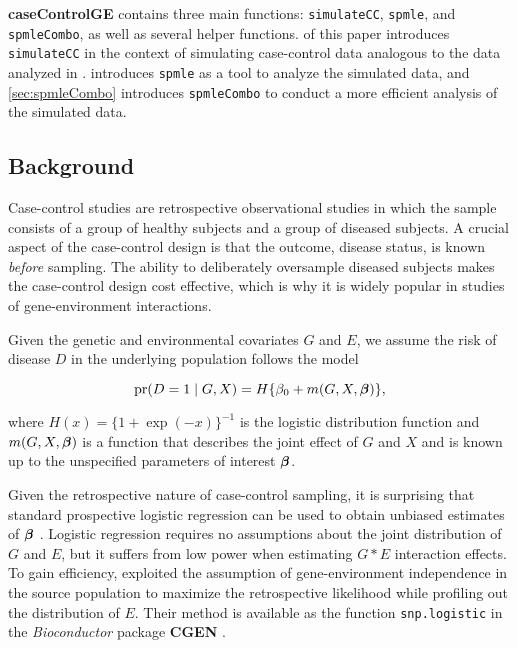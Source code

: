 \documentclass[]{article}
\begin{document}
\textbf{caseControlGE} contains three main functions:
\texttt{simulateCC}, \texttt{spmle}, and \texttt{spmleCombo}, as well as
several helper functions.  of this paper introduces
\texttt{simulateCC} in the context of simulating case-control data
analogous to the data analyzed in \cite{Wang2018unpublished}.
 introduces \texttt{spmle} as a tool to analyze the
simulated data, and \cref{sec:spmleCombo} introduces \texttt{spmleCombo}
to conduct a more efficient analysis of the simulated data.

\subsection{Background}

Case-control studies are retrospective observational studies in which
the sample consists of a group of healthy subjects and a group of
diseased subjects. A crucial aspect of the case-control design is that
the outcome, disease status, is known \emph{before} sampling. The
ability to deliberately oversample diseased subjects makes the
case-control design cost effective, which is why it is widely popular in
studies of gene-environment interactions.

Given the genetic and environmental covariates \(G\) and \(E\), we
assume the risk of disease \(D\) in the underlying population follows
the model

\begin{equation}
  \hbox{pr}(D=1 \mid G,X) = H\{\beta_0 + m(G,X,\mbox{\boldmath $\beta$})\}, \label{eq:logisticRisk}
\end{equation}

where \(H(x)=\{ 1 + \exp(-x)\}^{-1}\) is the logistic distribution
function and \(m(G,X,\mbox{\boldmath $\beta$})\) is a function that describes the joint
effect of \(G\) and \(X\) and is known up to the unspecified parameters
of interest \(\mbox{\boldmath $\beta$}\).

Given the retrospective nature of case-control sampling, it is
surprising that standard prospective logistic regression can be used to
obtain unbiased estimates of \(\mbox{\boldmath $\beta$}\) \citep{PrenticePyke1979}.
Logistic regression requires no assumptions about the joint distribution
of \(G\) and \(E\), but it suffers from low power when estimating
\(G * E\) interaction effects. To gain efficiency,
\citet{ChatterjeeCarroll2005} exploited the assumption of
gene-environment independence in the source population to maximize the
retrospective likelihood while profiling out the distribution of \(E\).
Their method is available as the function \texttt{snp.logistic} in the
\emph{Bioconductor} package \textbf{CGEN} \citep{CGEN2012}.
\end{document}
